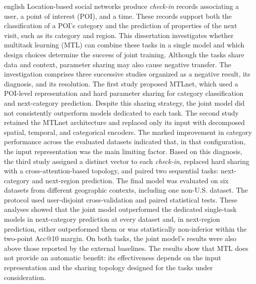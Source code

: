 \begin{resumo}[Abstract]
\begin{otherlanguage*}{english}
            \noindent Location-based social networks produce \emph{check-in} records
            associating a user, a point of interest (POI), and a time. These records
            support both the classification of a POI's category and the prediction of
            properties of the next visit, such as its category and region. This
            dissertation investigates whether multitask learning (MTL) can combine
            these tasks in a single model and which design choices determine the
            success of joint training. Although the tasks share data and context,
            parameter sharing may also cause negative transfer. The investigation
            comprises three successive studies organized as a negative result, its
            diagnosis, and its resolution. The first study proposed MTLnet, which used
            a POI-level representation and hard parameter sharing for category
            classification and next-category prediction. Despite this sharing
            strategy, the joint model did not consistently outperform models dedicated
            to each task. The second study
            retained the MTLnet architecture and replaced only its input with
            decomposed spatial, temporal, and categorical encoders. The marked
            improvement in category performance across the evaluated datasets
            indicated that, in that configuration, the input representation was the
            main limiting factor. Based on this diagnosis, the third study assigned a
            distinct vector to each \emph{check-in}, replaced hard sharing with a
            cross-attention-based topology, and paired two sequential tasks:
            next-category and next-region prediction. The final model was evaluated on
            six datasets from different geographic contexts, including one non-U.S.
            dataset.
            The protocol used user-disjoint cross-validation and paired statistical
            tests. These analyses showed that the joint model outperformed the dedicated
            single-task models in next-category prediction at every dataset and, in
            next-region prediction, either outperformed them or was statistically
            non-inferior within the two-point Acc@10 margin. On both tasks, the joint
            model's results were also above those reported by the external baselines.
            The results
            show that MTL does not
            provide an automatic benefit: its effectiveness depends on the input
            representation and the sharing topology designed for the tasks under
            consideration.


\end{otherlanguage*}
\end{resumo}
